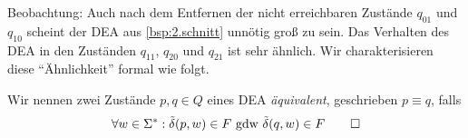 
%         
%
%

\medskip

Beobachtung: Auch nach dem Entfernen der nicht erreichbaren Zustände $q_{01}$ und $q_{10}$ scheint der \acs*{DEA} aus \autoref{bsp:2.schnitt} unnötig groß zu sein. Das Verhalten des \acs*{DEA} in den Zuständen $q_{11}$, $q_{20}$ und $q_{21}$ ist sehr ähnlich. 
Wir charakterisieren diese "`Ähnlichkeit"' formal wie folgt.

\begin{Def}[name={[Äquivalenz von \acs*{DEA}-Zuständen]}] %
  Wir nennen zwei Zustände $p,q\in Q$ eines \ac{DEA} \emph{äquivalent}, geschrieben $p\equiv q$, falls
  \begin{displaymath}
  \forall w\in\Sigma^*: \tilde\delta(p,w)\in F \text{ gdw } \tilde\delta(q,w)\in F
  \qedhere
  \end{displaymath}
\end{Def}

